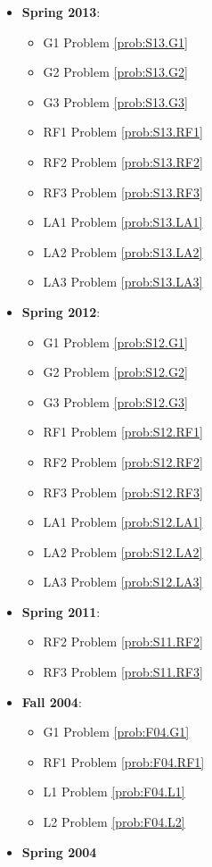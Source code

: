 \documentclass{article}
\theoremstyle{definition}
\begin{document}
\begin{itemize}
	\item \textbf{Spring 2013}:  
	\begin{itemize}
	\item G1 Problem \ref{prob:S13.G1} 
	\item G2 Problem \ref{prob:S13.G2} 
	\item G3 Problem \ref{prob:S13.G3}
	\item RF1 Problem \ref{prob:S13.RF1}
	\item RF2 Problem \ref{prob:S13.RF2}
	\item RF3 Problem \ref{prob:S13.RF3}
	\item LA1 Problem \ref{prob:S13.LA1}
	\item LA2 Problem \ref{prob:S13.LA2}
	\item LA3 Problem \ref{prob:S13.LA3}
	\end{itemize}
	\item \textbf{Spring 2012}:  
	\begin{itemize}
	\item G1 Problem \ref{prob:S12.G1} 
	\item G2 Problem \ref{prob:S12.G2} 
	\item G3 Problem \ref{prob:S12.G3}
	\item RF1 Problem \ref{prob:S12.RF1}
	\item RF2 Problem \ref{prob:S12.RF2}
	\item RF3 Problem \ref{prob:S12.RF3}
	\item LA1 Problem \ref{prob:S12.LA1}
	\item LA2 Problem \ref{prob:S12.LA2}
	\item LA3 Problem \ref{prob:S12.LA3}
	\end{itemize}
	\item \textbf{Spring 2011}:
	\begin{itemize}
		\item RF2 Problem \ref{prob:S11.RF2}
		\item RF3 Problem \ref{prob:S11.RF3}
	\end{itemize}
	\item \textbf{Fall 2004}:
	\begin{itemize}
		\item G1 Problem \ref{prob:F04.G1}
		\item RF1 Problem \ref{prob:F04.RF1}
		\item L1 Problem \ref{prob:F04.L1}
		\item L2 Problem \ref{prob:F04.L2}
	\end{itemize}
	\item \textbf{Spring 2004}

\end{itemize}
\end{document}
